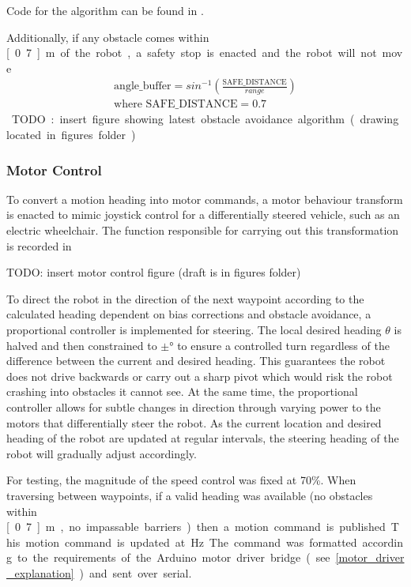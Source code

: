 \documentclass[titlepage,12pt,a4paper]{article}
\begin{document}
Code for the algorithm can be found in .

Additionally, if any obstacle comes within \unit[0.7]{m} of the robot, a safety stop is enacted and the robot will not move.

\begin{equation}
\begin{split}
	\text{angle\_buffer} = sin^{-1}(\frac{\text{SAFE\_DISTANCE}}{range})\\
	\text{where } \text{SAFE\_DISTANCE} = 0.7
\end{split}
	\label{equation:bearing_buffer}
\end{equation}

TODO: insert figure showing latest obstacle avoidance algorithm (drawing located in figures folder)
\subsubsection{Motor Control}

To convert a motion heading into motor commands, a motor behaviour transform is enacted to mimic joystick control for a differentially steered vehicle, such as an electric wheelchair. The function responsible for carrying out this transformation is recorded in 

TODO: insert motor control figure (draft is in figures folder)

To direct the robot in the direction of the next waypoint according to the calculated heading dependent on bias corrections and obstacle avoidance, a proportional controller is implemented for steering. The local desired heading $\theta$ is halved and then constrained to $\pm$\unit[30]{\degree} to ensure a controlled turn regardless of the difference between the current and desired heading. This guarantees the robot does not drive backwards or carry out a sharp pivot which would risk the robot crashing into obstacles it cannot see. At the same time, the proportional controller allows for subtle changes in direction through varying power to the motors that differentially steer the robot. As the current location and desired heading of the robot are updated at regular intervals, the steering heading of the robot will gradually adjust accordingly.

For testing, the magnitude of the speed control was fixed at 70\%. When traversing between waypoints, if a valid heading was available (no obstacles within \unit[0.7]{m}, no impassable barriers) then a motion command is published. This motion command is updated at \unit[10]{Hz}. The command was formatted according to the requirements of the Arduino motor driver bridge (see \ref{motor_driver_explanation}) and sent over serial.
\end{document}
